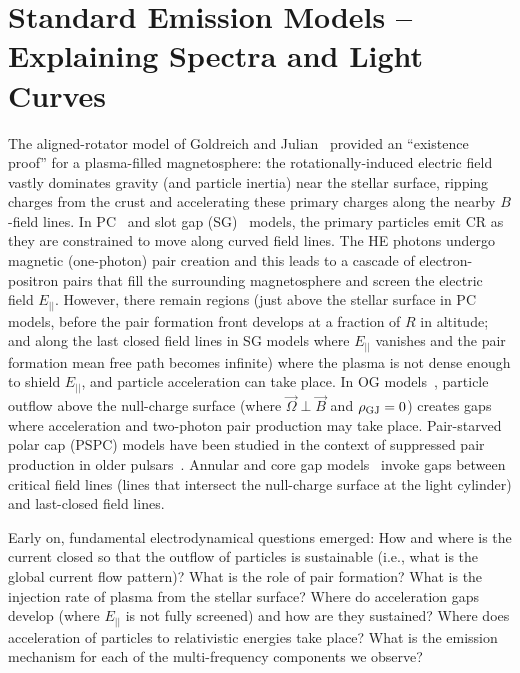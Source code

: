 \documentclass{PoS}
\begin{document}
\section{Standard Emission Models -- Explaining Spectra and Light Curves}\label{sec:OldTheory}
The aligned-rotator model of Goldreich and Julian~\cite{GJ69} provided an ``existence proof'' for a plasma-filled magnetosphere: the rotationally-induced electric field vastly dominates gravity (and particle inertia) near the stellar surface, ripping charges from the crust and accelerating these primary charges along the nearby $B$-field lines. In PC~\cite{DH96} and slot gap (SG)~\cite{Arons83} models, the primary particles emit CR as they are constrained to move along curved field lines. The HE photons undergo magnetic (one-photon) pair creation and this leads to a cascade of electron-positron pairs that fill the surrounding magnetosphere and screen the electric field $E_{||}$. However, there remain regions (just above the stellar surface in PC models, before the pair formation front develops at a fraction of $R$ in altitude; and along the last closed field lines in SG models where $E_{||}$ vanishes and the pair formation mean free path becomes infinite) where the plasma is not dense enough to shield $E_{||}$, and particle acceleration can take place. In OG models~\cite{CHR86,R96}, particle outflow above the null-charge surface (where $\vec{\Omega}\perp\vec{B}$ and $\rho_{\rm GJ}=0$) creates gaps where acceleration and two-photon pair production may take place. Pair-starved polar cap (PSPC) models have been studied in the context of suppressed pair production in older pulsars~\cite{HUM05}. Annular and core gap models~\cite{Qiao04,Du11} invoke gaps between critical field lines (lines that intersect the null-charge surface at the light cylinder) and last-closed field lines.

Early on, fundamental electrodynamical questions emerged: How and where is the current closed so that the outflow of particles is sustainable (i.e., what is the global current flow pattern)? What is the role of pair formation? What is the injection rate of plasma from the stellar surface? Where do acceleration gaps develop (where $E_{||}$ is not fully screened) and how are they sustained? Where does acceleration of particles to relativistic energies take place? What is the emission mechanism for each of the multi-frequency components we observe?
\end{document}
